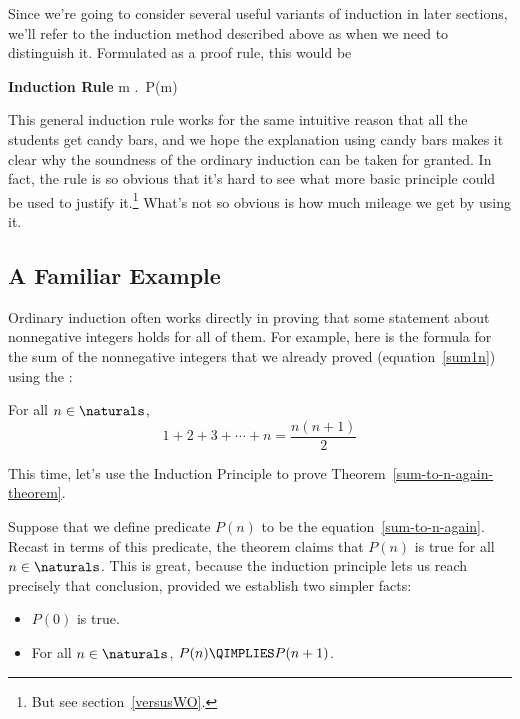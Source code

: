 Since we're going to consider several useful variants of induction in
later sections, we'll refer to the induction method described above as
 when we need to distinguish it.  Formulated as 
a proof rule, this would be
\begin{rul*} \textbf{Induction Rule}
{\forall m \in \naturals.\, P(m)}
\end{rul*}

This general induction rule works for the same intuitive reason that all
the students get candy bars, and we hope the explanation using candy bars
makes it clear why the soundness of the ordinary induction can be taken
for granted.  In fact, the rule is so obvious that it's hard to see what
more basic principle could be used to justify it.\footnote{But see
section~\ref{versusWO}.}  What's not so obvious is how much mileage 
we get by using it.

\subsection{A Familiar Example}

Ordinary induction often works directly in proving that some statement
about nonnegative integers holds for all of them.  For example, here is
the formula for the sum of the nonnegative integers that we already proved
(equation~\eqref{sum1n}) using the :

\begin{theorem}\label{sum-to-n-again-theorem}
For all $n \in \naturals$,
\begin{equation}\label{sum-to-n-again}
1 + 2 + 3 + \cdots + n = \frac{n(n+1)}{2}
\end{equation}
\end{theorem}

This time, let's use the Induction Principle to prove
Theorem~\ref{sum-to-n-again-theorem}.

Suppose that we define predicate $P(n)$ to be the
equation~\eqref{sum-to-n-again}.  Recast in terms of this predicate, the
theorem claims that $P(n)$ is true for all $n \in \naturals$.  This is
great, because the induction principle lets us reach precisely that
conclusion, provided we establish two simpler facts:
%
\begin{itemize}
\item $P(0)$ is true.
\item For all $n \in \naturals$, $P(n) \QIMPLIES P(n+1)$.
\end{itemize}

